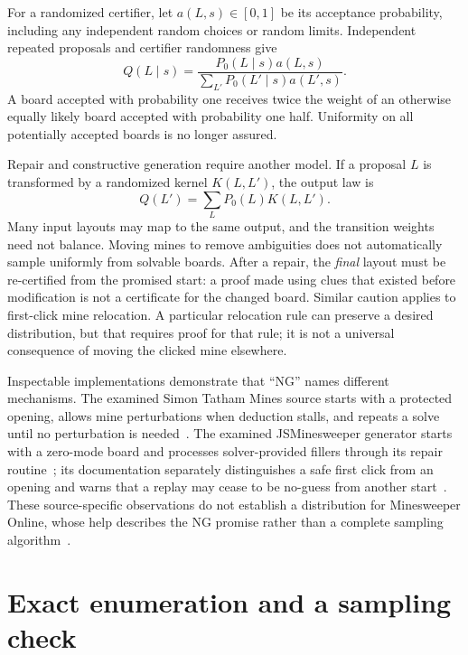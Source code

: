\documentclass[11pt]{article}
\begin{document}
For a randomized certifier, let $a(L,s)\in[0,1]$ be its acceptance probability, including any independent random choices or random limits. Independent repeated proposals and certifier randomness give
\begin{equation}
 Q(L\mid s)=\frac{P_0(L\mid s)a(L,s)}{\sum_{L'}P_0(L'\mid s)a(L',s)}.
 \label{eq:soft}
\end{equation}
A board accepted with probability one receives twice the weight of an otherwise equally likely board accepted with probability one half. Uniformity on all potentially accepted boards is no longer assured.

Repair and constructive generation require another model. If a proposal $L$ is transformed by a randomized kernel $K(L,L')$, the output law is
\begin{equation}
 Q(L')=\sum_L P_0(L)K(L,L').
 \label{eq:kernel}
\end{equation}
Many input layouts may map to the same output, and the transition weights need not balance. Moving mines to remove ambiguities does not automatically sample uniformly from solvable boards. After a repair, the \emph{final} layout must be re-certified from the promised start: a proof made using clues that existed before modification is not a certificate for the changed board. Similar caution applies to first-click mine relocation. A particular relocation rule can preserve a desired distribution, but that requires proof for that rule; it is not a universal consequence of moving the clicked mine elsewhere.

Inspectable implementations demonstrate that ``NG'' names different mechanisms. The examined Simon Tatham Mines source starts with a protected opening, allows mine perturbations when deduction stalls, and repeats a solve until no perturbation is needed~\cite{tatham}. The examined JSMinesweeper generator starts with a zero-mode board and processes solver-provided fillers through its repair routine~\cite{js-source}; its documentation separately distinguishes a safe first click from an opening and warns that a replay may cease to be no-guess from another start~\cite{js-doc}. These source-specific observations do not establish a distribution for Minesweeper Online, whose help describes the NG promise rather than a complete sampling algorithm~\cite{wom}.

\section{Exact enumeration and a sampling check}
\end{document}
